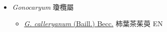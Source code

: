 
  \begin{itemize}
 \item[] \textit{Gonocaryum} 瓊欖屬
                                
  \begin{itemize}
        \item[] \href{http://www.theplantlist.org/tpl1.1/search?q=Gonocaryum+calleryanum}{\textit{G. calleryanum} (Baill.) Becc.}   柿葉茶茱萸   EN
  \end{itemize}
  \end{itemize}
